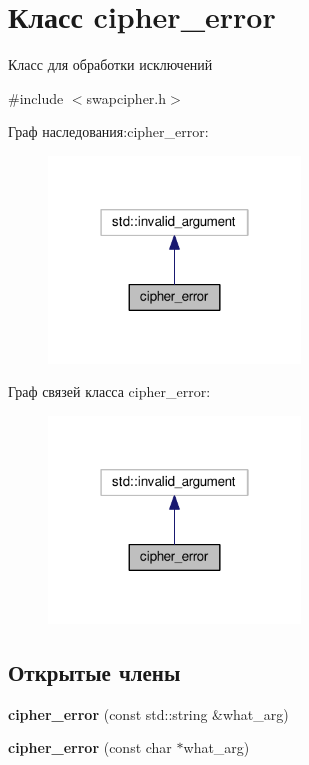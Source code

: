 \hypertarget{classcipher__error}{}\section{Класс cipher\+\_\+error}
\label{classcipher__error}


Класс для обработки исключений  




{\ttfamily \#include $<$swapcipher.\+h$>$}



Граф наследования\+:cipher\+\_\+error\+:\nopagebreak
\begin{figure}[H]
\begin{center}
\leavevmode
\includegraphics[width=190pt]{classcipher__error__inherit__graph}
\end{center}
\end{figure}


Граф связей класса cipher\+\_\+error\+:\nopagebreak
\begin{figure}[H]
\begin{center}
\leavevmode
\includegraphics[width=190pt]{classcipher__error__coll__graph}
\end{center}
\end{figure}
\subsection*{Открытые члены}
\begin{DoxyCompactItemize}
\item 
\mbox{\label{classcipher__error_aac662e216a84bfeb873303c7b88d029e}} 
{\bfseries cipher\+\_\+error} (const std\+::string \&what\+\_\+arg)
\item 
\mbox{\label{classcipher__error_a18cf27d9c2cd2538d3cb8f17e9a55f3e}} 
{\bfseries cipher\+\_\+error} (const char $\ast$what\+\_\+arg)
\end{DoxyCompactItemize}


